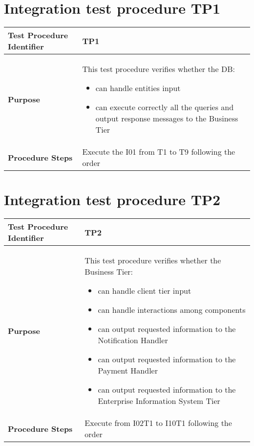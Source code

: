 \section{Integration test procedure TP1} \label{TP1}
\begin{center}
	\vspace{0.6cm}
	\begin{tabular}{|l|p{9cm}|}
		\hline
		\textbf{Test Procedure Identifier} & TP1 \bigstrut \\\hline
		\textbf{Purpose} 
		& This test procedure verifies whether the DB: 
		\begin{itemize} 
			\item can handle entities input
			\item can execute correctly all the queries and output response messages to the Business Tier %
		\end{itemize} \bigstrut \\\hline
		\textbf{Procedure Steps} & Execute the I01 from T1 to T9 following the order \bigstrut \\\hline
	\end{tabular}
\end{center}

\section{Integration test procedure TP2} \label{TP2}
\begin{center}
	\vspace{0.6cm}
	\begin{tabular}{|l|p{9cm}|}
		\hline
		\textbf{Test Procedure Identifier} & TP2 \bigstrut \\\hline
		\textbf{Purpose} 
		& This test procedure verifies whether the Business Tier: 
		\begin{itemize} 
			\item can handle client tier input
			\item can handle interactions among components 
			\item can output requested information to the Notification Handler
			\item can output requested information to the Payment Handler
			\item can output requested information to the Enterprise Information System Tier
		\end{itemize} \bigstrut \\\hline
		\textbf{Procedure Steps} & Execute from I02T1 to I10T1 following the order \bigstrut \\\hline %
	\end{tabular}
\end{center}

